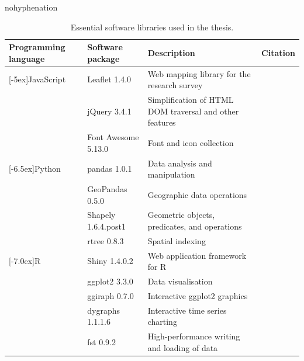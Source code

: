 \begin{hyphenrules}{nohyphenation}
    \begin{table}[H]
        \centering
        \caption[Essential software packages in thesis]{Essential software libraries used in the thesis.} 
        \label{tab:used_soft}
        \def\arraystretch{1.2}
        \setlength\tabcolsep{1.2ex}
        \begin{tabular}{ @{} >{\raggedright\arraybackslash}p{2.5cm} >{\raggedright\arraybackslash}p{3cm} >{\raggedright\arraybackslash}p{4cm} >{\raggedleft\arraybackslash}p{3cm} @{} }
            \toprule
            Programming language & Software package & Description & Citation \\
            \midrule
            \multirow{3}{*}[-5ex]{JavaScript} & Leaflet 1.4.0 & Web mapping library for the research survey & \cite{Agafonkin2019} \\
            & jQuery 3.4.1 & Simplification of HTML DOM traversal and other features & \cite{JQuery2020} \\
            & Font Awesome 5.13.0 & Font and icon collection & \cite{FonticonsInc2020} \\
            \greyrule
            \multirow{4}{*}[-6.5ex]{Python} & pandas 1.0.1 & Data analysis and manipulation & \cite{McKinney2011a} \\
            & GeoPandas 0.5.0 & Geographic data operations & \cite{GeoPandasDevelopers2019} \\
            & Shapely 1.6.4.post1 & Geometric objects, predicates, and operations & \cite{Gillies2019} \\
            & rtree 0.8.3 & Spatial indexing & \cite{Gillies2014} \\
            \greyrule
            \multirow{4}{*}[-7.0ex]{R} & Shiny 1.4.0.2 & Web application framework for R & \cite{Chang2019} \\
            & ggplot2 3.3.0 & Data visualisation & \cite{Wickham2016} \\
            & ggiraph 0.7.0 & Interactive ggplot2 graphics & \cite{Gohel2019} \\
            & dygraphs 1.1.1.6 & Interactive time series charting & \cite{Vanderkam2018} \\
            & fst 0.9.2 & High-performance writing and loading of data & \cite{Klik2020} \\
            \bottomrule
        \end{tabular}
    \end{table} 
\end{hyphenrules}


